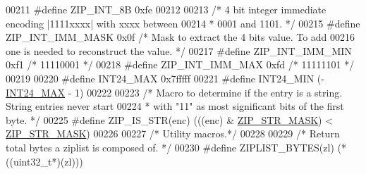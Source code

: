 \begin{DoxyCode}
00211 \textcolor{preprocessor}{#}\textcolor{preprocessor}{define} \textcolor{preprocessor}{ZIP\_INT\_8B} 0xfe
00212 
00213 \textcolor{comment}{/* 4 bit integer immediate encoding |1111xxxx| with xxxx between}
00214 \textcolor{comment}{ * 0001 and 1101. */}
00215 \textcolor{preprocessor}{#}\textcolor{preprocessor}{define} \textcolor{preprocessor}{ZIP\_INT\_IMM\_MASK} 0x0f   \textcolor{comment}{/* Mask to extract the 4 bits value. To add}
00216 \textcolor{comment}{                                   one is needed to reconstruct the value. */}
00217 \textcolor{preprocessor}{#}\textcolor{preprocessor}{define} \textcolor{preprocessor}{ZIP\_INT\_IMM\_MIN} 0xf1    \textcolor{comment}{/* 11110001 */}
00218 \textcolor{preprocessor}{#}\textcolor{preprocessor}{define} \textcolor{preprocessor}{ZIP\_INT\_IMM\_MAX} 0xfd    \textcolor{comment}{/* 11111101 */}
00219 
00220 \textcolor{preprocessor}{#}\textcolor{preprocessor}{define} \textcolor{preprocessor}{INT24\_MAX} 0x7fffff
00221 \textcolor{preprocessor}{#}\textcolor{preprocessor}{define} \textcolor{preprocessor}{INT24\_MIN} \textcolor{preprocessor}{(}\textcolor{preprocessor}{-}\hyperlink{ziplist_8c_a4ade7f65b05984f1f21a8223e70c9fac}{INT24\_MAX} \textcolor{preprocessor}{-} 1\textcolor{preprocessor}{)}
00222 
00223 \textcolor{comment}{/* Macro to determine if the entry is a string. String entries never start}
00224 \textcolor{comment}{ * with "11" as most significant bits of the first byte. */}
00225 \textcolor{preprocessor}{#}\textcolor{preprocessor}{define} \textcolor{preprocessor}{ZIP\_IS\_STR}\textcolor{preprocessor}{(}\textcolor{preprocessor}{enc}\textcolor{preprocessor}{)} \textcolor{preprocessor}{(}\textcolor{preprocessor}{(}\textcolor{preprocessor}{(}\textcolor{preprocessor}{enc}\textcolor{preprocessor}{)} \textcolor{preprocessor}{&} \hyperlink{ziplist_8c_a8e8a0c4c5531ab6885734f42c1fb4398}{ZIP\_STR\_MASK}\textcolor{preprocessor}{)} \textcolor{preprocessor}{<} \hyperlink{ziplist_8c_a8e8a0c4c5531ab6885734f42c1fb4398}{ZIP\_STR\_MASK}\textcolor{preprocessor}{)}
00226 
00227 \textcolor{comment}{/* Utility macros.*/}
00228 
00229 \textcolor{comment}{/* Return total bytes a ziplist is composed of. */}
00230 \textcolor{preprocessor}{#}\textcolor{preprocessor}{define} \textcolor{preprocessor}{ZIPLIST\_BYTES}\textcolor{preprocessor}{(}\textcolor{preprocessor}{zl}\textcolor{preprocessor}{)}       \textcolor{preprocessor}{(}\textcolor{preprocessor}{*}\textcolor{preprocessor}{(}\textcolor{preprocessor}{(}\textcolor{preprocessor}{uint32\_t}\textcolor{preprocessor}{*}\textcolor{preprocessor}{)}\textcolor{preprocessor}{(}\textcolor{preprocessor}{zl}\textcolor{preprocessor}{)}\textcolor{preprocessor}{)}\textcolor{preprocessor}{)}

\end{DoxyCode}
